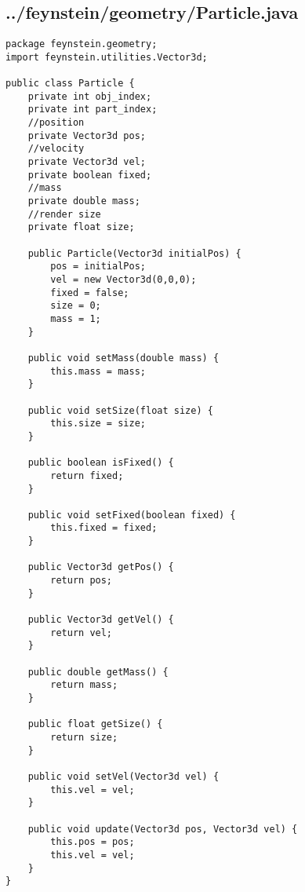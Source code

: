 \subsection*{../feynstein/geometry/Particle.java}
\begin{lstlisting}
package feynstein.geometry;
import feynstein.utilities.Vector3d;

public class Particle {
	private int obj_index;
	private int part_index;
	//position
	private Vector3d pos;
	//velocity
	private Vector3d vel;
	private boolean fixed;
	//mass
	private double mass;
	//render size
	private float size;
	
	public Particle(Vector3d initialPos) {
		pos = initialPos;
		vel = new Vector3d(0,0,0);
		fixed = false;
		size = 0;
		mass = 1;
	}
	
	public void setMass(double mass) {
		this.mass = mass;
	}
	
	public void setSize(float size) {
		this.size = size;
	}
	
	public boolean isFixed() {
		return fixed;
	}
	
	public void setFixed(boolean fixed) {
		this.fixed = fixed;
	}
	
	public Vector3d getPos() {
		return pos;
	}
	
	public Vector3d getVel() {
		return vel;
	}
	
	public double getMass() {
		return mass;
	}
	
	public float getSize() {
		return size;
	}

	public void setVel(Vector3d vel) {
	    this.vel = vel;
	}
	
	public void update(Vector3d pos, Vector3d vel) {
		this.pos = pos;
		this.vel = vel;
	}
}\end{lstlisting}

